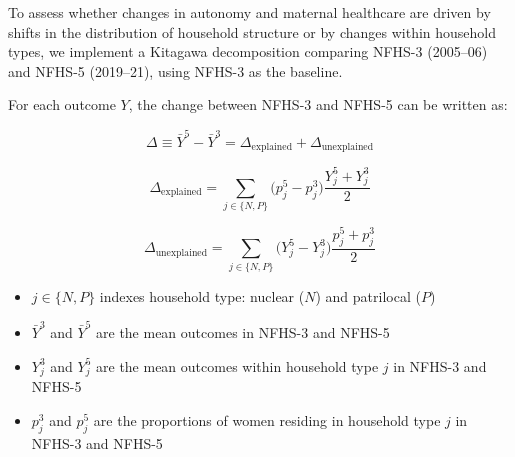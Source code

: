 \documentclass[12pt]{article}
\begin{document}
To assess whether changes in autonomy and maternal healthcare are driven by shifts in the distribution of household structure or by changes within household types, we implement a Kitagawa decomposition \citep{kitagawa1955components} comparing NFHS-3 (2005--06) and NFHS-5 (2019--21), using NFHS-3 as the baseline.

For each outcome $Y$, the change between NFHS-3 and NFHS-5 can be written as:

\begin{equation}
\Delta \equiv \bar Y^{5} - \bar Y^{3}
= \Delta_{\text{explained}} + \Delta_{\text{unexplained}}
\end{equation}

\begin{equation}
\Delta_{\text{explained}} =
\sum_{j \in \{N,P\}} \big(p_j^{5} - p_j^{3}\big)\frac{Y_j^{5} + Y_j^{3}}{2}
\end{equation}

\begin{equation}
\Delta_{\text{unexplained}} =
\sum_{j \in \{N,P\}} \big(Y_j^{5} - Y_j^{3}\big)\frac{p_j^{5} + p_j^{3}}{2}
\end{equation}

\begin{itemize}
    \item $j \in \{N,P\}$ indexes household type: nuclear ($N$) and patrilocal ($P$)
    \item $\bar Y^{3}$ and $\bar Y^{5}$ are the mean outcomes in NFHS-3 and NFHS-5
    \item $Y_j^{3}$ and $Y_j^{5}$ are the mean outcomes within household type $j$ in NFHS-3 and NFHS-5
    \item $p_j^{3}$ and $p_j^{5}$ are the proportions of women residing in household type $j$ in NFHS-3 and NFHS-5
\end{itemize}

\setcounter{section}{-1}
\renewcommand{\thesection}{S.\arabic{section}}
\renewcommand{\thesubsection}{S.\arabic{section}.\arabic{subsection}}

\setcounter{table}{0}
\renewcommand{\thetable}{A\arabic{table}}
\setcounter{figure}{0}
\renewcommand{\thefigure}{A\arabic{figure}}
\end{document}
